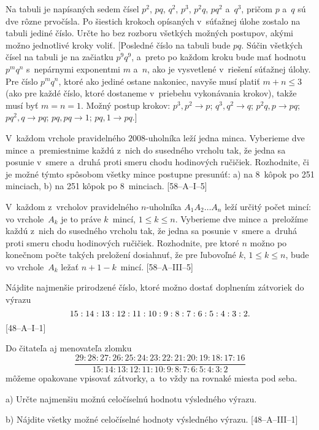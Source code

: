 {Na tabuli je napísaných sedem čísel $p^2$, $pq$, $q^2$, $p^3$, $p^2q$,
$pq^2$ a~$q^3$, pričom $p$ a~$q$ sú dve rôzne prvočísla.
Po šiestich krokoch opísaných v~súťažnej úlohe zostalo
na tabuli jediné číslo. Určte ho bez rozboru všetkých
možných postupov, akými možno jednotlivé kroky voliť. [Posledné
číslo na tabuli bude $pq$. Súčin všetkých
čísel na tabuli je na začiatku $p^9q^9$, a~preto po každom kroku
bude mať hodnotu $p^mq^n$ s~nepárnymi exponentmi $m$ a~$n$,
ako je vysvetlené v~riešení súťažnej úlohy. Pre číslo $p^mq^n$,
ktoré ako jediné ostane nakoniec, navyše musí platiť
$m+n\le3$ (ako pre každé číslo, ktoré dostaneme v~priebehu
vykonávania krokov), takže musí byť $m=n=1$. Možný postup krokov:
$p^3,p^2\rightarrow p$; $q^3,q^2\rightarrow q$; $p^2q,p\rightarrow
pq$; $pq^2,q\rightarrow pq$; $pq,pq\rightarrow 1$; $pq,1\rightarrow
pq$.]

\D
V~každom vrchole pravidelného $2008$-uholníka leží jedna minca.
Vyberieme dve mince a~premiestnime každú z~nich do susedného vrcholu
tak, že jedna sa posunie v~smere
a~druhá proti smeru chodu hodinových ručičiek.
Rozhodnite, či je možné týmto spôsobom všetky mince postupne
presunúť: a) na 8~kôpok po 251 minciach, b) na 251 kôpok po 8~minciach.
[58--A--I--5]

V~každom z~vrcholov pravidelného $n$-uholníka $A_1A_2\dots A_n$ leží určitý počet mincí: vo vrchole~$A_k$ je to práve $k$~mincí, $1\le k\le n$. Vyberieme dve mince a~preložíme každú z~nich do susedného vrcholu tak, že jedna sa posunie v~smere a~druhá proti smeru chodu hodinových ručičiek. Rozhodnite, pre ktoré $n$ možno po konečnom počte takých preložení dosiahnuť, že pre ľubovoľné $k$, $1\le k\le n$, bude vo vrchole~$A_k$ ležať $n+1-k$~mincí.
[58--A--III--5]

Nájdite najmenšie prirodzené číslo, ktoré možno dostať doplnením zátvoriek do
výrazu
$$
\postdisplaypenalty 10000
15:14:13:12:11:10:9:8:7:6:5:4:3:2.
$$
[48--A--I--1]

Do čitateľa aj menovateľa zlomku
$$
\frac{29:28:27:26:25:24:23:22:21:20:19:18:17:16}
{15:14:13:12:11:10:9:8:7:6:5:4:3:2}
$$
môžeme opakovane vpisovať zátvorky, a~to vždy na rovnaké miesta pod
seba.
\item{a)} Určte najmenšiu možnú celočíselnú hodnotu výsledného výrazu.
\item{b)} Nájdite všetky možné celočíselné hodnoty výsledného výrazu.
[48--A--III--1]
}

